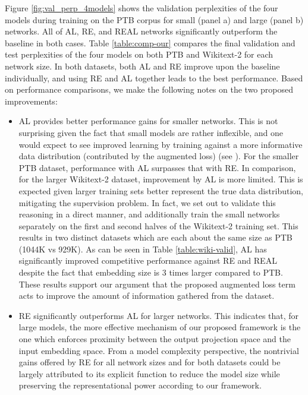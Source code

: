 Figure \ref{fig:val_perp_4models} shows the validation perplexities of the four models during training on the PTB corpus for small (panel a) and large (panel b) networks. All of AL, RE, and REAL networks significantly outperform the baseline in both cases.
Table \ref{table:comp-our} compares the final validation and test perplexities of the four models on both PTB and Wikitext-2 for each network size.
In both datasets, both AL and RE improve upon the baseline individually, and using RE and AL together leads to the best performance.
Based on performance comparisons, we make the following notes on the two proposed improvements:
\begin{itemize}[noitemsep]
\item AL provides better performance gains for smaller networks.
This is not surprising given the fact that small models are rather inflexible, and one would expect to see improved learning by training against a more informative data distribution (contributed by the augmented loss) (see \citet{hinton2015distilling}). 
For the smaller PTB dataset, performance with AL surpasses that with RE. In comparison, for the larger Wikitext-2 dataset, improvement by AL is more limited. 
This is expected given larger training sets better represent the true data distribution, mitigating the supervision problem.
In fact, we set out to validate this reasoning in a direct manner, and additionally train the small networks separately on the first and second halves of the Wikitext-2 training set.
This results in two distinct datasets which are each about the same size as PTB (1044K vs 929K).
As can be seen in Table \ref{table:wiki-valid}, AL has significantly improved competitive performance against RE and REAL despite the fact that embedding size is 3 times larger compared to PTB.
These results support our argument that the proposed augmented loss term acts to improve the amount of information gathered from the dataset.
\item RE significantly outperforms AL for larger networks.
This indicates that, for large models, the more effective mechanism of our proposed framework is the one which enforces proximity between the output projection space and the input embedding space.
From a model complexity perspective, the nontrivial gains offered by RE for all network sizes and for both datasets could be largely attributed to its explicit function to reduce the model size while preserving the representational power according to our framework.
\end{itemize}

